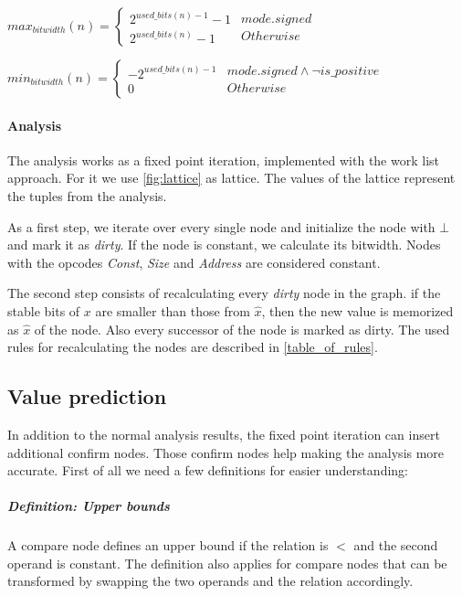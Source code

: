 $
max_{bitwidth}(n)=
\left\{
\begin{array}{l}2^{used\_bits(n)-1}-1\\2^{used\_bits(n)}-1\end{array}
\begin{array}{l} {mode.signed} \\ {Otherwise} \end{array}
\right.
$

$
min_{bitwidth}(n)=
\left\{
\begin{array}{l}-2^{used\_bits(n)-1}\\0\end{array}
\begin{array}{l} {mode.signed \wedge \neg is\_positive} \\ {Otherwise} \end{array}
\right.
$



\paragraph{Analysis}
\label{analysis_explain}
The analysis works as a fixed point iteration, implemented with the work list approach. For it we use  \autoref{fig:lattice} as lattice. The values of the lattice represent the tuples from the analysis.

As a first step, we iterate over every single node and initialize the node with $\bot$ and mark it as \textit{dirty}. If the node is constant, we calculate its bitwidth. Nodes with the opcodes \textit{Const}, \textit{Size} and \textit{Address} are considered constant.

The second step consists of recalculating every \textit{dirty} node in the graph. 
if the stable bits of $x$ are smaller than those from $\hat{x}$, 
then the new value is memorized as $\hat{x}$ of the node. Also every successor of the node is marked as dirty. The used rules for recalculating the nodes are described in \autoref{table_of_rules}.

\subsection{Value prediction}
In addition to the normal analysis results, the fixed point iteration can insert additional confirm nodes. Those confirm nodes help making the analysis more accurate.
First of all we need a few definitions for easier understanding:

\subparagraph{Definition: Upper bounds}
A compare node defines an upper bound if the relation is $<$ and the second operand is constant.\newline
The definition also applies for compare nodes that can be transformed by swapping the two operands and the relation accordingly.

